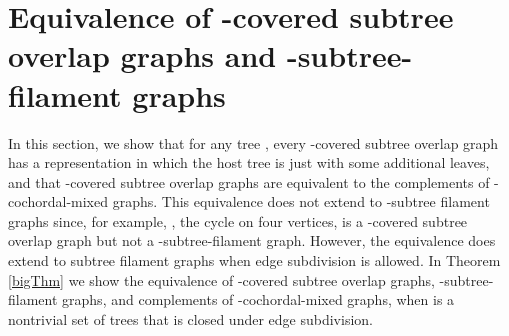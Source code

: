 \documentclass[
final
]{dmtcs-episciences}        \usepackage{graphics, amsthm, amsmath, amssymb, algorithm, algorithmic}
\begin{document}
\section{Equivalence of -covered subtree overlap graphs and -subtree-filament graphs}\label{equiv}


In this section, we show that for any tree , 
every -covered subtree overlap graph has a representation in which the host tree is just  with some additional leaves, and that -covered subtree overlap graphs are equivalent to the complements of -cochordal-mixed graphs. This equivalence does not extend to -subtree filament graphs since, for example, 
, the cycle on four vertices, is a -covered subtree overlap graph but not a -subtree-filament graph.
However, the equivalence does extend to subtree filament graphs when edge subdivision is allowed. In Theorem \ref{bigThm}
we show the equivalence of 
-covered subtree overlap graphs,
-subtree-filament graphs, and
complements of -cochordal-mixed graphs, 
when  is a nontrivial set of trees that is closed under edge subdivision.
\end{document}
